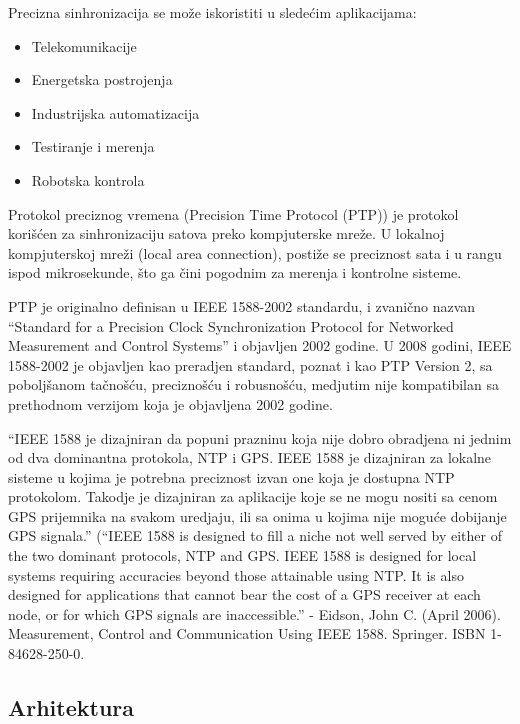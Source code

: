 \documentclass[a4paper,12pt, master]{etf}
\begin{document}
	Precizna sinhronizacija se mo\v{z}e iskoristiti u slede\'{c}im aplikacijama:
	\begin{itemize}
		\item Telekomunikacije
		\item Energetska postrojenja
		\item Industrijska automatizacija
		\item Testiranje i merenja
		\item Robotska kontrola
	\end{itemize}

	Protokol preciznog vremena (Precision Time Protocol (PTP)) je protokol
	kori\v{s}\'{c}en za sinhronizaciju satova preko kompjuterske mre\v{z}e. U
	lokalnoj kompjuterskoj mre\v{z}i (local area connection), posti\v{z}e se
	preciznost sata i u rangu ispod mikrosekunde, \v{s}to ga \v{c}ini pogodnim
	za merenja i kontrolne sisteme.

	PTP je originalno definisan u IEEE 1588-2002 standardu, i zvani\v{c}no
	nazvan ``Standard for a Precision Clock Synchronization Protocol for
	Networked Measurement and Control Systems'' i objavljen 2002 godine. U 2008
	godini, IEEE 1588-2002 je objavljen kao preradjen standard, poznat i kao
	PTP Version 2, sa pobolj\v{s}anom ta\v{c}no\v{s}\'{c}u, precizno\v{s}\'{c}u
	i robusno\v{s}\'{c}u, medjutim nije kompatibilan sa prethodnom verzijom
	koja je objavljena 2002 godine.

	``IEEE 1588 je dizajniran da popuni prazninu koja nije dobro obradjena ni
	jednim od dva dominantna protokola, NTP i GPS\@. IEEE 1588 je dizajniran za
	lokalne sisteme u kojima je	potrebna preciznost izvan one koja je dostupna
	NTP protokolom. Takodje je dizajniran za aplikacije koje se ne mogu nositi
	sa cenom GPS prijemnika na svakom uredjaju, ili sa onima u kojima nije
	mogu\'{c}e dobijanje GPS signala.'' (``IEEE 1588 is designed to fill a niche
	not well served by either of the two dominant protocols, NTP and GPS\@.
	IEEE 1588 is designed for local systems requiring accuracies beyond those
	attainable using NTP\@. It is also designed for applications that cannot
	bear the cost of a GPS receiver at each node, or for which GPS signals are
	inaccessible.'' - Eidson, John C. (April 2006). Measurement, Control and
	Communication Using IEEE 1588. Springer. ISBN 1-84628-250-0.

	\subsection{Arhitektura}
\end{document}

